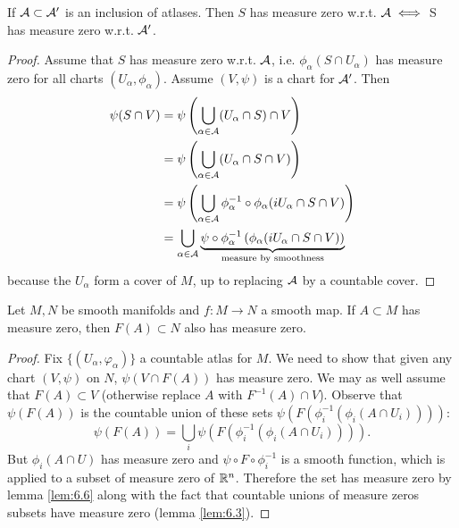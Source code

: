 \begin{lemma}\label{lem:6.7}
    If \(\mathcal{A}\subset\mathcal{A}'\) is an inclusion of atlases. Then \(S\) has measure zero w.r.t. \(\mathcal{A}\iff\) S has measure zero w.r.t. \(\mathcal{A}'\).
\end{lemma}

\begin{proof}%
    Assume that \(S\) has measure zero w.r.t. \(\mathcal{A}\), i.e. \(\phi_\alpha(S\cap U_\alpha)\) has measure zero for all charts 
    \((U_\alpha,\phi_\alpha)\). Assume \((V,\psi)\) is a chart for \(\mathcal{A}'\). Then 
    \begin{align*}
        \psi(S\cap V)&=\psi\left(\bigcup_{\alpha\in\mathcal{A}} (U_\alpha\cap S)\cap V\right)\\
                     &=\psi\left(\bigcup_{\alpha\in\mathcal{A}} (U_\alpha\cap S\cap V)\right)\\
                     &=\psi\left(\bigcup_{\alpha\in\mathcal{A}} \phi_\alpha^{-1}\circ \phi_\alpha (iU_\alpha\cap S\cap V)\right)\\
                     &=\bigcup_{\alpha\in\mathcal{A}} \underbrace{\psi\circ\phi_\alpha^{-1}\left( \phi_\alpha (iU_\alpha\cap S\cap V)\right)}_{\text{measure by smoothness}}
    \end{align*}
    because the \(U_\alpha\) form a cover of \(M\), up to replacing \(\mathcal{A}\) by a countable cover.
\end{proof}


\begin{lemma}\label{6.8}
    Let \(M,N\) be smooth manifolds and \(f:M\to N\) a smooth map. If \(A\subset M\)
    has measure zero, then \(F(A)\subset N\) also has measure zero.
\end{lemma}

\begin{proof}
    Fix \(\{(U_\alpha,\varphi_\alpha)\}\) a countable atlas for \(M\). We need to show 
    that given any chart \((V,\psi)\) on \(N\), \(\psi(V\cap F(A))\) has measure zero.
    We may as well assume that \(F(A)\subset V\) (otherwise replace \(A\) with \(F^{-1}(A)\cap V\)).
    Observe that \(\psi(F(A))\) is the countable union of these sets \(\psi(F(\phi_i^{-1}(\phi_i(A\cap U_i))))\):
    \[\psi(F(A))=\bigcup_{i}\psi(F(\phi_i^{-1}(\phi_i(A\cap U_i)))).\]
    But \(\phi_i(A\cap U)\) has measure zero and \(\psi\circ F\circ \phi_i^{-1}\) is a smooth function, which is applied 
    to a subset of measure zero of \(\mathbb{R}^n\). Therefore the set has measure zero by lemma \ref{lem:6.6} along with 
    the fact that countable unions of measure zeros subsets have measure zero (lemma \ref{lem:6.3}).
\end{proof}
